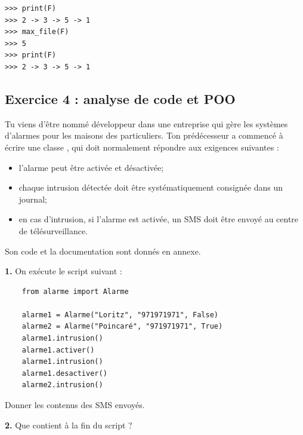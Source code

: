 \documentclass[article,a4paper,firamath,12pt]{nsi}
\begin{document}
\begin{exemple}[ d'utilisation]
    \begin{verbatim}
>>> print(F)
>>> 2 -> 3 -> 5 -> 1
>>> max_file(F)
>>> 5
>>> print(F)
>>> 2 -> 3 -> 5 -> 1
\end{verbatim}
\end{exemple}


\subsection*{Exercice 4 : analyse de code et POO}

Tu viens d'être nommé développeur dans une entreprise qui gère les systèmes d'alarmes pour les maisons des particuliers.
Ton prédécesseur a commencé à écrire une classe , qui doit normalement répondre aux exigences suivantes :

\begin{itemize}
    \item   l'alarme peut être activée et désactivée;
    \item   chaque intrusion détectée doit être systématiquement consignée dans un journal;
    \item   en cas d'intrusion, si l'alarme est activée, un SMS doit être envoyé au centre de télésurveillance.
\end{itemize}

Son code et la documentation sont donnés en annexe.


\textbf{1.} On exécute le script suivant :

\begin{pyc}
    \begin{verbatim}
    from alarme import Alarme
    
    alarme1 = Alarme("Loritz", "971971971", False)
    alarme2 = Alarme("Poincaré", "971971971", True)
    alarme1.intrusion()
    alarme1.activer()
    alarme1.intrusion()
    alarme1.desactiver()
    alarme2.intrusion()        
    \end{verbatim}
\end{pyc}

Donner les contenus des SMS envoyés.\\


\textbf{2.} Que contient  à la fin du script ?\\
\end{document}
